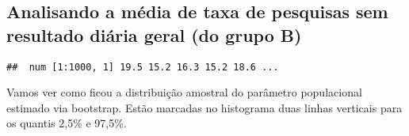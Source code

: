 \documentclass[]{article}
\newenvironment{Shaded}{\begin{snugshade}}{\end{snugshade}}
\newcommand{\KeywordTok}[1]{\textcolor[rgb]{0.13,0.29,0.53}{\textbf{#1}}}
\newcommand{\DataTypeTok}[1]{\textcolor[rgb]{0.13,0.29,0.53}{#1}}
\newcommand{\DecValTok}[1]{\textcolor[rgb]{0.00,0.00,0.81}{#1}}
\newcommand{\StringTok}[1]{\textcolor[rgb]{0.31,0.60,0.02}{#1}}
\newcommand{\CommentTok}[1]{\textcolor[rgb]{0.56,0.35,0.01}{\textit{#1}}}
\newcommand{\OperatorTok}[1]{\textcolor[rgb]{0.81,0.36,0.00}{\textbf{#1}}}
\newcommand{\NormalTok}[1]{#1}
\begin{document}
\subsection{Analisando a média de taxa de pesquisas sem resultado diária
geral (do grupo
B)}\label{analisando-a-media-de-taxa-de-pesquisas-sem-resultado-diaria-geral-do-grupo-b}

\begin{Shaded}
\end{Shaded}

\begin{verbatim}
##  num [1:1000, 1] 19.5 15.2 16.3 15.2 18.6 ...
\end{verbatim}

Vamos ver como ficou a distribuição amostral do parâmetro populacional
estimado via bootstrap. Estão marcadas no histograma duas linhas
verticais para os quantis 2,5\% e 97,5\%.
\end{document}
